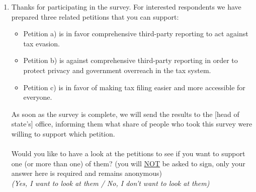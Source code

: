 \documentclass[11pt]{article}
\begin{document}
\begin{enumerate}[resume]
    \item Thanks for participating in the survey. For interested respondents we have prepared three related petitions that you can support: 
    \begin{itemize}
        \item Petition a) is in favor comprehensive third-party reporting to act against tax evasion. 
        \item Petition b) is against comprehensive third-party reporting in order to protect privacy and government overreach in the tax system. 
        \item Petition c) is in favor of making tax filing easier and more accessible for everyone. 
    \end{itemize}
    As soon as the survey is complete, we will send the results to the [head of state’s] office, informing them what share of people who took this survey were willing to support which petition. \\ \\ Would you like to have a look at the petitions to see if you want to support one (or more than one) of them? (you will \underline{NOT} be asked to sign, only your answer here is required and remains anonymous)\\  \textit{(Yes, I want to look at them / No, I don't want to look at them)} 
     

\end{enumerate}
\end{document}
